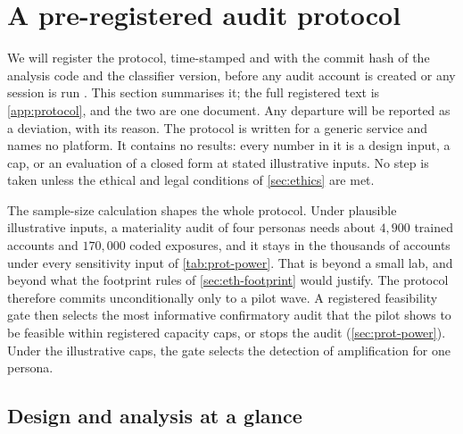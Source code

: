 \providecommand{\Se}{\mathrm{Se}}
\providecommand{\Sp}{\mathrm{Sp}}
\providecommand{\PPV}{\mathrm{PPV}}
\providecommand{\FOR}{\mathrm{FOR}}

\section{A pre-registered audit protocol}\label{sec:protocol}

We will register the protocol, time-stamped and with the commit hash of the analysis code and the classifier version, before any audit account is created or any session is run \citep{nosek2018}. This section summarises it; the full registered text is \cref{app:protocol}, and the two are one document. Any departure will be reported as a deviation, with its reason. The protocol is written for a generic service and names no platform. It contains no results: every number in it is a design input, a cap, or an evaluation of a closed form at stated illustrative inputs. No step is taken unless the ethical and legal conditions of \cref{sec:ethics} are met.

The sample-size calculation shapes the whole protocol. Under plausible illustrative inputs, a materiality audit of four personas needs about $4{,}900$ trained accounts and $170{,}000$ coded exposures, and it stays in the thousands of accounts under every sensitivity input of \cref{tab:prot-power}. That is beyond a small lab, and beyond what the footprint rules of \cref{sec:eth-footprint} would justify. The protocol therefore commits unconditionally only to a pilot wave. A registered feasibility gate then selects the most informative confirmatory audit that the pilot shows to be feasible within registered capacity caps, or stops the audit (\cref{sec:prot-power}). Under the illustrative caps, the gate selects the detection of amplification for one persona.

\subsection{Design and analysis at a glance}\label{sec:prot-summary}

